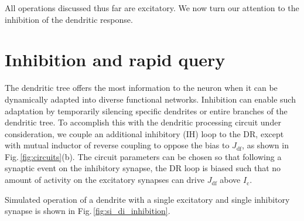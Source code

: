 \documentclass[twocolumn]{article}
\begin{document}
All operations discussed thus far are excitatory. We now turn our attention to the inhibition of the dendritic response.

\section{\label{sec:inhibition_and_rapid_query}Inhibition and rapid query}
The dendritic tree offers the most information to the neuron when it can be dynamically adapted into diverse functional networks. Inhibition can enable such adaptation by temporarily silencing specific dendrites or entire branches of the dendritic tree. To accomplish this with the dendritic processing circuit under consideration, we couple an additional inhibitory (IH) loop to the DR, except with mutual inductor of reverse coupling to oppose the bias to $J_{\mathrm{df}}$, as shown in Fig.\,\ref{fig:circuits}(b). The circuit parameters can be chosen so that following a synaptic event on the inhibitory synapse, the DR loop is biased such that no amount of activity on the excitatory synapses can drive $J_{\mathrm{df}}$ above $I_{\mathrm{c}}$.   

\begin{figure} 
\end{figure}
Simulated operation of a dendrite with a single excitatory and single inhibitory synapse is shown in Fig.\,\ref{fig:si_di_inhibition}.
\end{document}
